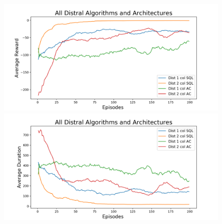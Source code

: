 \documentclass[12pt]{report}
\begin{document}
\begin{figure}[H]
\centering
\begin{minipage}{.5\textwidth}
\centering
\includegraphics[width=\textwidth]{figs/all_algos_rwd.png}
\end{minipage}%
\centering
\begin{minipage}{.5\textwidth}
\centering
\includegraphics[width=\textwidth]{figs/all_algos_dur.png}
\end{minipage}%
\end{figure}
\end{document}
